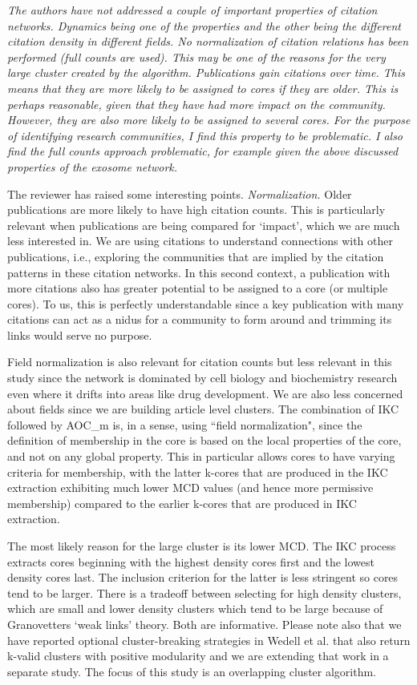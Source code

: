 \documentclass[11pt, oneside]{article}   	%
\begin{document}
\emph{The authors have not addressed a couple of important properties of citation networks. Dynamics being one of the properties and the other being the different citation density in different fields. No normalization of citation relations has been performed (full counts are used). This may be one of the reasons for the very large cluster created by the algorithm. Publications gain citations over time. This means that they are more likely to be assigned to cores if they are older. This is perhaps reasonable, given that they have had more impact on the community. However, they are also more likely to be assigned to several cores. For the purpose of identifying research communities, I find this property to be problematic. I also find the full counts approach problematic, for example given the above discussed properties of the exosome network.}

The reviewer has raised some interesting points. \emph{Normalization.} Older publications are more likely to have high citation counts. This is particularly relevant when publications are being compared for `impact', which we are much less interested in. We are using citations to understand connections with other publications, i.e., exploring the communities that are implied by the citation patterns in these citation networks. In this second context, a publication with more citations also has greater potential to be assigned to a core (or multiple cores). To us, this is perfectly understandable since a key publication with many citations can act as a nidus for a community to form around and trimming its links would serve no purpose.  

Field normalization is also relevant for citation counts but less relevant in this study since the network is dominated by cell biology and biochemistry research even where it drifts into areas like drug development. We are also less concerned about fields since we are building article level clusters. The combination of IKC followed by AOC\_m is, in a sense, using ``field normalization", since the definition of membership in the core is based on the local properties of the core, and not on any global property. This in particular allows cores to have varying criteria for membership, with the latter k-cores that are produced in the IKC extraction exhibiting much lower MCD values (and hence more permissive membership) compared to the earlier k-cores that are produced in IKC extraction. 

The most likely reason for the large cluster is its lower MCD. The IKC process extracts cores beginning with the highest density cores first and the lowest density cores last. The inclusion criterion for the latter is less stringent so cores tend to be larger. There is a tradeoff between selecting for high density clusters, which are small and lower density clusters which tend to be large because of Granovetters `weak links' theory. Both are informative. Please note also that we have reported optional cluster-breaking strategies in Wedell et al. that also return k-valid clusters with positive modularity and we are extending that work in a separate study. The focus of this study is an overlapping cluster algorithm.
\end{document}
